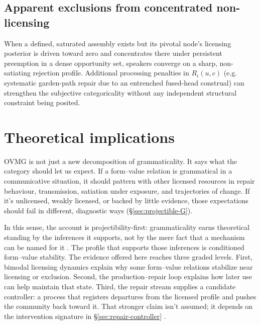 \documentclass[12pt,letterpaper]{article}
\newcommand{\eg}{e.g.\,\xspace}
\begin{document}
\subsection{Apparent exclusions from concentrated non-licensing}
\label{sec:categorical-without-bans}

When a defined, saturated assembly exists but its pivotal node's licensing
posterior is driven toward zero and concentrates there under persistent
preemption in a dense opportunity set, speakers converge on a sharp,
non-satiating rejection profile. Additional processing penalties in $R_i(u,c)$
(\eg systematic garden-path repair due to an entrenched fused-head construal)
can strengthen the subjective categoricality without any independent structural
constraint being posited.

\section{Theoretical implications}\label{sec:implications}

OVMG is not just a new decomposition of grammaticality. It says what
the category should let us expect. If a form--value relation is grammatical in a
communicative situation, it should pattern with other licensed resources in
repair behaviour, transmission, satiation under exposure, and trajectories of
change. If it's unlicensed, weakly licensed, or backed by little evidence, those
expectations should fail in different, diagnostic ways (\S\ref{sec:projectible-G}).

In this sense, the account is projectibility-first: grammaticality
earns theoretical standing by the inferences it supports, not by the mere fact
that a mechanism can be named for it \autocite{Goodman1955, boyd1999,
millikan1999, khalidi2013, khalidi2018nodes, slater2015,
reynolds2026kindsProjectibilityProfiles}. The profile that supports those
inferences is conditioned form--value stability. The evidence offered here
reaches three graded levels. First, bimodal licensing dynamics explain why some
form--value relations stabilize near licensing or exclusion. Second, the
production--repair loop explains how later use can help maintain that state.
Third, the repair stream supplies a candidate controller: a process that
registers departures from the licensed profile and pushes the community back
toward it. That stronger claim isn't assumed; it depends on the intervention
signature in \S\ref{sec:repair-controller}
\autocite{woodward2003MakingThingsHappen, woodward2001,
reynolds2026notEveryStableCluster}.
\end{document}

